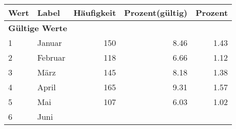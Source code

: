     \begin{longtable}{lXrrr}
     \toprule
     \textbf{Wert} & \textbf{Label} & \textbf{Häufigkeit} & \textbf{Prozent(gültig)} & \textbf{Prozent} \\
     \endhead
     \midrule
     \multicolumn{5}{l}{\textbf{Gültige Werte}}\\

     1 &
     \multicolumn{1}{X}{ Januar   } &


       \num{150} &
       \num[round-mode=places,round-precision=2]{8.46} &
         \num[round-mode=places,round-precision=2]{1.43} \\

     2 &
     \multicolumn{1}{X}{ Februar   } &


       \num{118} &
       \num[round-mode=places,round-precision=2]{6.66} &
         \num[round-mode=places,round-precision=2]{1.12} \\

     3 &
     \multicolumn{1}{X}{ März   } &


       \num{145} &
       \num[round-mode=places,round-precision=2]{8.18} &
         \num[round-mode=places,round-precision=2]{1.38} \\

     4 &
     \multicolumn{1}{X}{ April   } &


       \num{165} &
       \num[round-mode=places,round-precision=2]{9.31} &
         \num[round-mode=places,round-precision=2]{1.57} \\

     5 &
     \multicolumn{1}{X}{ Mai   } &


       \num{107} &
       \num[round-mode=places,round-precision=2]{6.03} &
         \num[round-mode=places,round-precision=2]{1.02} \\

     6 &
     \multicolumn{1}{X}{ Juni   } &



\end{longtable}
